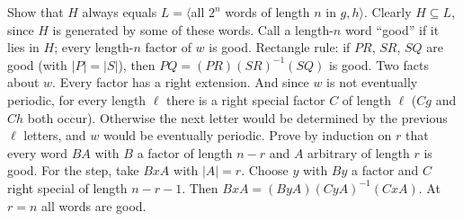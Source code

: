 \documentclass[11pt,a4paper]{article}
\begin{document}
 Show that $H$ always equals $L=\langle$all $2^n$ words of length $n$ in $g,h\rangle$. Clearly $H\subseteq L$, since $H$ is generated by some of these words. Call a length-$n$ word ``good'' if it lies in $H$; every length-$n$ factor of $w$ is good.
 Rectangle rule: if $PR$, $SR$, $SQ$ are good (with $|P|=|S|$), then $PQ=(PR)(SR)^{-1}(SQ)$ is good.
 Two facts about $w$. Every factor has a right extension. And since $w$ is not eventually periodic, for every length $\ell$ there is a right special factor $C$ of length $\ell$ ($Cg$ and $Ch$ both occur). Otherwise the next letter would be determined by the previous $\ell$ letters, and $w$ would be eventually periodic.
 Prove by induction on $r$ that every word $BA$ with $B$ a factor of length $n-r$ and $A$ arbitrary of length $r$ is good. For the step, take $BxA$ with $|A|=r$. Choose $y$ with $By$ a factor and $C$ right special of length $n-r-1$. Then $BxA=(ByA)(CyA)^{-1}(CxA)$. At $r=n$ all words are good.
\end{document}
